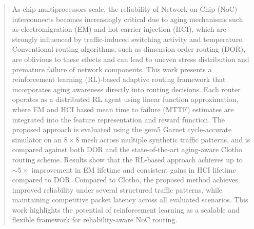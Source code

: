 \documentclass[basc,oneside]{ubcthesis}
\begin{document}
\begin{abstract}                %

As chip multiprocessors scale, the reliability of Network-on-Chip (NoC) interconnects becomes increasingly critical due to aging mechanisms such as electromigration (EM) and hot-carrier injection (HCI), which are strongly influenced by traffic-induced switching activity and temperature. Conventional routing algorithms, such as dimension-order routing (DOR), are oblivious to these effects and can lead to uneven stress distribution and premature failure of network components. This work presents a reinforcement learning (RL)-based adaptive routing framework that incorporates aging awareness directly into routing decisions. Each router operates as a distributed RL agent using linear function approximation, where EM and HCI based mean time to failure (MTTF) estimates are integrated into the feature representation and reward function. The proposed approach is evaluated using the gem5 Garnet cycle-accurate simulator on an $8 \times 8$ mesh across multiple synthetic traffic patterns, and is compared against both DOR and the state-of-the-art aging-aware Clotho routing scheme. Results show that the RL-based approach achieves up to $\sim5\times$ improvement in EM lifetime and consistent gains in HCI lifetime compared to DOR. Compared to Clotho, the proposed method achieves improved reliability under several structured traffic patterns, while maintaining competitive packet latency across all evaluated scenarios. This work highlights the potential of reinforcement learning as a scalable and flexible framework for reliability-aware NoC routing.

\end{abstract}

\tableofcontents                %
\listoffigures                  %

\mainmatter
\end{document}
